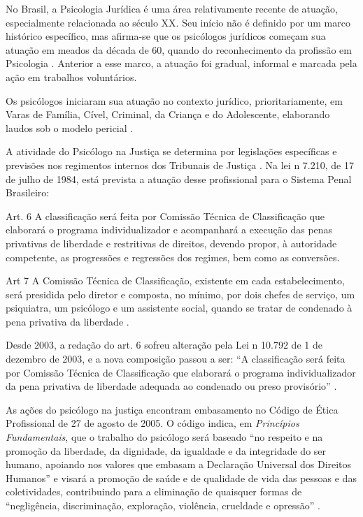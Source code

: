 No Brasil, a Psicologia Jurídica é uma área relativamente recente de atuação, especialmente relacionada ao século XX. Seu início não é definido por um marco histórico específico, mas afirma-se que os psicólogos jurídicos começam sua atuação em meados da década de 60, quando do reconhecimento da profissão em Psicologia \cite{LAGO2009}. Anterior a esse marco, a atuação foi gradual, informal e marcada pela ação em trabalhos voluntários.

Os psicólogos iniciaram sua atuação no contexto jurídico, prioritariamente, em Varas de Família, Cível, Criminal, da Criança e do Adolescente, elaborando laudos sob o modelo pericial \cite{COSTA2009}.

A atividade do Psicólogo na Justiça se determina por legislações específicas e previsões nos regimentos internos dos Tribunais de Justiça \cite{COSTA2009}. Na lei n{\textordmasculine} 7.210, de 17 de julho de 1984, está prevista a atuação desse profissional para o Sistema Penal Brasileiro:

\begin{citacao}
	Art. 6{\textordmasculine} A classificação será feita por Comissão Técnica de Classificação que elaborará o programa individualizador e acompanhará a execução das penas privativas de liberdade e restritivas de direitos, devendo propor, à autoridade competente, as progressões e regressões dos regimes, bem como as conversões.
	
	Art 7{\textordmasculine} A Comissão Técnica de Classificação, existente em cada estabelecimento, será presidida pelo diretor e composta, no mínimo, por dois chefes de serviço, um psiquiatra, um psicólogo e um assistente social, quando se tratar de condenado à pena privativa da liberdade \cite{BRASIL1984}.
\end{citacao}

Desde 2003, a redação do art. 6{\textordmasculine} sofreu alteração pela Lei n{\textordmasculine} 10.792 de 1{\textordmasculine} de dezembro de 2003, e a nova composição passou a ser: ``A classificação será feita por Comissão Técnica de Classificação que elaborará o programa individualizador da pena privativa de liberdade adequada ao condenado ou preso provisório'' \cite{BRASIL2003}. 

As ações do psicólogo na justiça encontram embasamento no Código de Ética Profissional de 27 de agosto de 2005. O código indica, em \emph{Princípios Fundamentais}, que o trabalho do psicólogo será baseado ``no respeito e na promoção da liberdade, da dignidade, da igualdade e da integridade do ser humano, apoiando nos valores que embasam a Declaração Universal dos Direitos Humanos'' e visará a promoção de saúde e de qualidade de vida das pessoas e das coletividades, contribuindo para a eliminação de quaisquer formas de ``negligência, discriminação, exploração, violência, crueldade e opressão'' \cite[p. 27]{LIMA2008}. 


